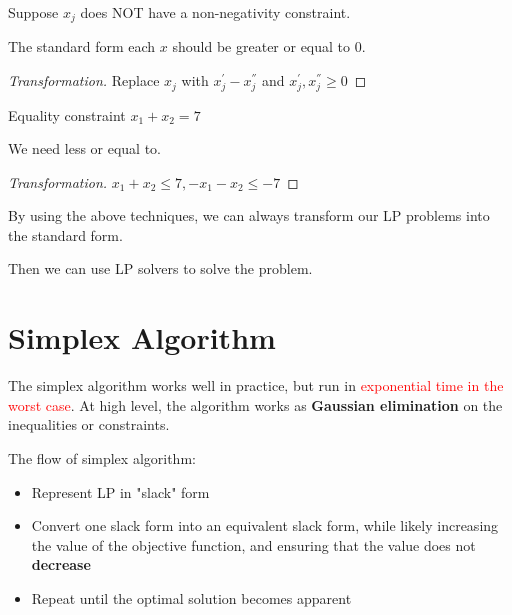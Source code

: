 \begin{example}
    Suppose \(x_j\)  does NOT have a non-negativity constraint.
    \begin{remark}
        The standard form each \(x\) should be greater or equal to 0. 
    \end{remark}
\end{example}
\begin{proof}[Transformation]
    Replace \(x_j\) with \(x_j^{'} - x_j^{''}\) and \(x_j^{'}, x_j^{''} \geq 0\)   
\end{proof}

\begin{example}
    Equality constraint \(x_1 + x_2 = 7\) 
    \begin{remark}
        We need less or equal to.
    \end{remark}
\end{example}
\begin{proof}[Transformation]
    \(x_1 + x_2 \leq 7, -x_1 - x_2 \leq -7\) 
\end{proof}

By using the above techniques, we can always transform our LP problems into the standard form.

Then we can use LP solvers to solve the problem.

\section{Simplex Algorithm}

The simplex algorithm works well in practice, but run in \textcolor{red}{exponential time in the worst case}.
At high level, the algorithm works as \textbf{Gaussian elimination} on the inequalities or constraints. 

\begin{definition}
    The flow of simplex algorithm:
    \begin{itemize}
        \item Represent LP in "slack" form
        \item Convert one slack form into an equivalent slack form, while likely increasing the value of the objective function, and ensuring that the value does not \textbf{decrease} 
        \item Repeat until the optimal solution becomes apparent
    \end{itemize}
\end{definition}

